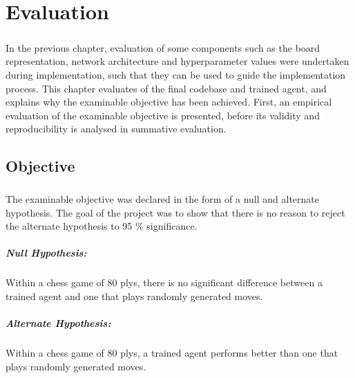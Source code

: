 \documentclass[12pt,a4paper]{book}
\begin{document}

\chapter{Evaluation}

\paragraph{} In the previous chapter, evaluation of some components such as the board representation, network architecture and hyperparameter values were undertaken during implementation, such that they can be used to guide the implementation process. This chapter evaluates of the final codebase and trained agent, and explains why the examinable objective has been achieved. First, an empirical evaluation of the examinable objective is presented, before its validity and reproducibility is analysed in summative evaluation.

\section{Objective}

\paragraph{} The examinable objective was declared in the form of a null and alternate hypothesis. The goal of the project was to show that there is no reason to reject the alternate hypothesis to 95 \% significance.

\paragraph{Null Hypothesis:} Within a chess game of 80 plys, there is no significant difference between a trained agent and one that plays randomly generated moves.

\paragraph{Alternate Hypothesis:} Within a chess game of 80 plys, a trained agent performs better than one that plays randomly generated moves.
\end{document}
